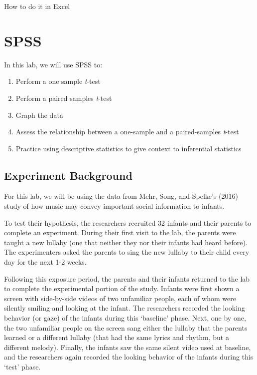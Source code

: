 \documentclass[
]{book}
\providecommand{\tightlist}{%
  \setlength{\itemsep}{0pt}\setlength{\parskip}{0pt}}
\begin{document}
How to do it in Excel

\hypertarget{spss-4}{%
\section{SPSS}\label{spss-4}}

In this lab, we will use SPSS to:

\begin{enumerate}
\def\labelenumi{\arabic{enumi}.}
\tightlist
\item
  Perform a one sample \emph{t}-test
\item
  Perform a paired samples \emph{t}-test
\item
  Graph the data
\item
  Assess the relationship between a one-sample and a paired-samples \emph{t}-test
\item
  Practice using descriptive statistics to give context to inferential statistics
\end{enumerate}

\hypertarget{experiment-background}{%
\subsection{Experiment Background}\label{experiment-background}}

For this lab, we will be using the data from Mehr, Song, and Spelke's (2016) study of how music may convey important social information to infants.

To test their hypothesis, the researchers recruited 32 infants and their parents to complete an experiment. During their first visit to the lab, the parents were taught a new lullaby (one that neither they nor their infants had heard before). The experimenters asked the parents to sing the new lullaby to their child every day for the next 1-2 weeks.

Following this exposure period, the parents and their infants returned to the lab to complete the experimental portion of the study. Infants were first shown a screen with side-by-side videos of two unfamiliar people, each of whom were silently smiling and looking at the infant. The researchers recorded the looking behavior (or gaze) of the infants during this `baseline' phase. Next, one by one, the two unfamiliar people on the screen sang either the lullaby that the parents learned or a different lullaby (that had the same lyrics and rhythm, but a different melody). Finally, the infants saw the same silent video used at baseline, and the researchers again recorded the looking behavior of the infants during this `test' phase.
\end{document}
